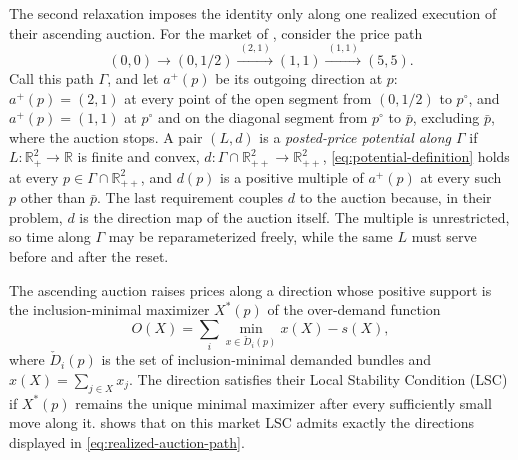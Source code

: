 \documentclass[11pt,a4paper,fleqn]{article}
\theoremstyle{plain}
\theoremstyle{definition}
\newcommand{\R}{\mathbb{R}}
\begin{document}
The second relaxation imposes the identity only along one realized execution of their ascending auction. For the market of , consider the price path
\begin{equation}\label{eq:realized-auction-path}
(0,0)\longrightarrow(0,1/2)
\xrightarrow{\ (2,1)\ }(1,1)
\xrightarrow{\ (1,1)\ }(5,5).
\end{equation}
Call this path $\Gamma$, and let $a^+(p)$ be its outgoing direction at $p$: $a^+(p)=(2,1)$ at every point of the open segment from $(0,1/2)$ to $p^\circ$, and $a^+(p)=(1,1)$ at $p^\circ$ and on the diagonal segment from $p^\circ$ to $\bar p$, excluding $\bar p$, where the auction stops. A pair $(L,d)$ is a \emph{posted-price potential along $\Gamma$} if $L:\R_+^2\to\R$ is finite and convex, $d:\Gamma\cap\R_{++}^2\to\R_{++}^2$, \eqref{eq:potential-definition} holds at every $p\in\Gamma\cap\R_{++}^2$, and $d(p)$ is a positive multiple of $a^+(p)$ at every such $p$ other than $\bar p$. The last requirement couples $d$ to the auction because, in their problem, $d$ is the direction map of the auction itself. The multiple is unrestricted, so time along $\Gamma$ may be reparameterized freely, while the same $L$ must serve before and after the reset.

The ascending auction raises prices along a direction whose positive support is the inclusion-minimal maximizer $X^*(p)$ of the over-demand function
\[
O(X)=\sum_i\min_{x\in\check D_i(p)}x(X)-s(X),
\]
where $\check D_i(p)$ is the set of inclusion-minimal demanded bundles and $x(X)=\sum_{j\in X}x_j$. The direction satisfies their Local Stability Condition (LSC) if $X^*(p)$ remains the unique minimal maximizer after every sufficiently small move along it.  shows that on this market LSC admits exactly the directions displayed in \eqref{eq:realized-auction-path}.
\end{document}

